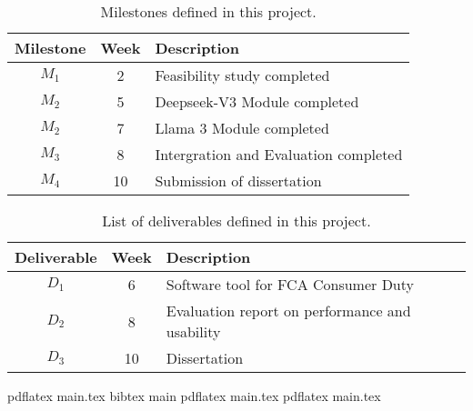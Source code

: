 \documentclass[a4paper,11pt]{article}
\begin{document}
\begin{table}[htbp]
    \begin{center}
        \begin{tabular}{|c|c|l|}
        \hline
        \textbf{Milestone} & \textbf{Week} & \textbf{Description} \\
        \hline
        $M_1$ & 2 & Feasibility study completed \\
        $M_2$ & 5 & Deepseek-V3 Module completed \\
        $M_2$ & 7 & Llama 3 Module completed \\
        $M_3$ & 8 & Intergration and Evaluation completed \\
        $M_4$ & 10 & Submission of dissertation \\
        \hline
        \end{tabular} 
    \end{center}
    \caption{Milestones defined in this project.}
    \label{fig:milestones}
\end{table}

\begin{table}[htbp]
    \begin{center}
        \begin{tabular}{|c|c|l|}
        \hline
        \textbf{Deliverable} & \textbf{Week} & \textbf{Description} \\
        \hline
        $D_1$ & 6 & Software tool for FCA Consumer Duty\\
        $D_2$ & 8 & Evaluation report on performance and usability \\
        $D_3$ & 10 & Dissertation \\
        \hline
        \end{tabular} 
    \end{center}
    \caption{List of deliverables defined in this project.}
    \label{fig:deliverables}
\end{table}



{\small
}

pdflatex main.tex
bibtex main
pdflatex main.tex
pdflatex main.tex
\end{document}

